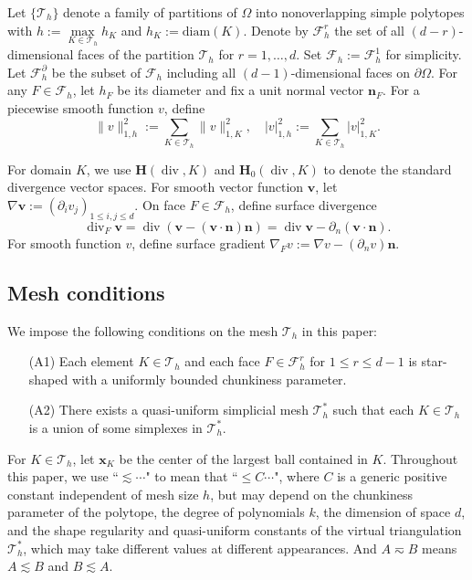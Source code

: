 \documentclass[10pt]{amsart}
\renewcommand{\div}{\operatorname{div}}
\numberwithin{equation}{section}
\begin{document}
Let $\{\mathcal {T}_h\}$ denote a family of partitions
of $\Omega$ into nonoverlapping simple polytopes with $h:=\max\limits_{K\in \mathcal {T}_h}h_K$
and $h_K:=\mbox{diam}(K)$.
Denote by $\mathcal F_h^r$ the set of all $(d-r)$-dimensional faces of the partition $\mathcal T_h$ for $r=1,\ldots,d$. Set $\mathcal F_h:=\mathcal F_h^1$ for simplicity. Let $\mathcal F_h^{\partial}$ be the subset of $\mathcal F_h$ including all $(d-1)$-dimensional faces on $\partial\Omega$. 
For any $F\in\mathcal{F}_h$,
let $h_F$ be its diameter and fix a unit normal vector $\boldsymbol{n}_F$.
For a piecewise smooth function $v$, define 
$$
\|v\|_{1,h}^2:=\sum_{K\in\mathcal T_h}\|v\|_{1,K}^2,\quad |v|_{1,h}^2:=\sum_{K\in\mathcal T_h}|v|_{1,K}^2.
$$

For domain $K$, we use $\boldsymbol{H}(\div, K)$ and $\boldsymbol{H}_0(\div, K)$ to denote the standard divergence vector spaces. 
For smooth vector function $\boldsymbol{v}$, let $\nabla\boldsymbol{v}:=(\partial_iv_j)_{1\leq i,j\leq d}$.
On face $F\in\mathcal F_h$, define surface divergence
$$
\div_F\boldsymbol{v}=\div(\boldsymbol{v}-(\boldsymbol{v}\cdot\boldsymbol{n})\boldsymbol{n})=\div\boldsymbol{v}-\partial_n(\boldsymbol{v}\cdot\boldsymbol{n}).
$$
For smooth function $v$, define surface gradient $\nabla_Fv:=\nabla v-(\partial_nv)\boldsymbol{n}$.



\subsection{Mesh conditions}
We impose the following conditions on the mesh $\mathcal T_h$ in this paper:
\begin{itemize}
 \item[(A1)] Each element $K\in \mathcal T_h$ and each face $F\in \mathcal F_h^r$ for $1\leq r\leq d-1$ is star-shaped with a uniformly bounded chunkiness parameter.

 \item[(A2)] There exists a quasi-uniform simplicial mesh $\mathcal T_h^*$ such that each $K\in \mathcal T_h$ is a union of some simplexes in $\mathcal T_h^*$.
\end{itemize}

For $K\in \mathcal T_h$, let $\boldsymbol{x}_K$ be the center of  the largest ball contained in $K$.
Throughout this paper, we use
``$\lesssim\cdots $" to mean that ``$\leq C\cdots$", where
$C$ is a generic positive constant independent of mesh size $h$, but may depend on the chunkiness parameter of the polytope, the degree of polynomials $k$, the dimension of space $d$, and the shape regularity and quasi-uniform constants of the virtual triangulation $\mathcal T^*_h$,
which may take different values at different appearances. And $A\eqsim B$ means $A\lesssim B$ and $B\lesssim A$.
\end{document}
